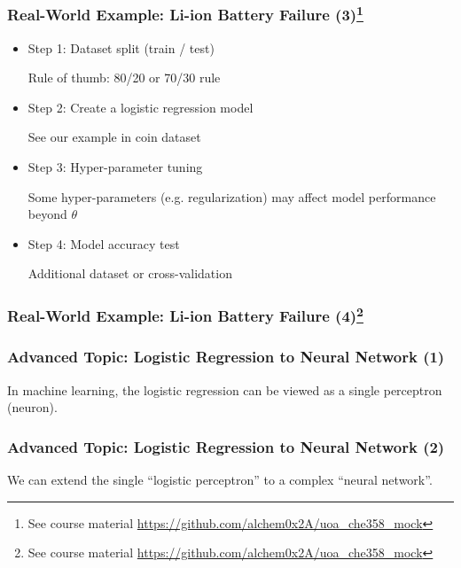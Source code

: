 \documentclass[10pt,aspectratio=169]{beamer}
\begin{document}
      \begin{frame}
        \frametitle{Real-World Example: Li-ion Battery Failure (3)\let\thefootnote\relax\footnote{{\tiny See course material \url{https://github.com/alchem0x2A/uoa_che358_mock}}}}

        \begin{itemize}
        \item Step 1: Dataset split (train / test)

              Rule of thumb: 80/20 or 70/30 rule
          
        \item Step 2: Create a logistic regression model

              See our example in coin dataset
          
        \item Step 3: Hyper-parameter tuning

          Some hyper-parameters (e.g. regularization) may affect model performance beyond $\theta$
          
        \item Step 4: Model accuracy test

          Additional dataset or cross-validation
        \end{itemize}
        
        
      \end{frame}

      \begin{frame}
        \frametitle{Real-World Example: Li-ion Battery Failure (4)\let\thefootnote\relax\footnote{{\tiny See course material \url{https://github.com/alchem0x2A/uoa_che358_mock}}}}

        
        
        
      \end{frame}

      \begin{frame}
        \frametitle{Advanced Topic: Logistic Regression to Neural Network (1)}
        In machine learning, the logistic regression can be viewed as
        a single perceptron (neuron).

        
      \end{frame}

      \begin{frame}
        \frametitle{Advanced Topic: Logistic Regression to Neural Network (2)}
        We can extend the single ``logistic perceptron'' to a complex ``neural network''.
        
      \end{frame}
\end{document}
